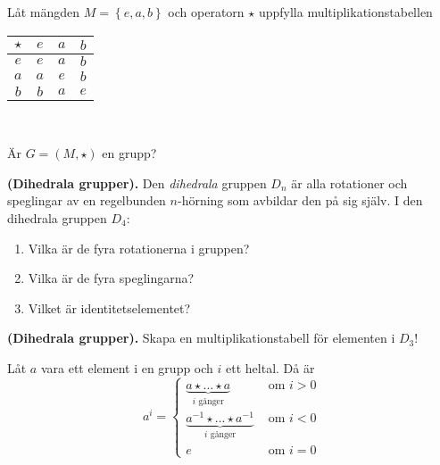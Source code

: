 \documentclass[11pt,fleqn]{book} %
\begin{document}
\begin{problem}
  Låt mängden \(M = \left\{e, a, b\right\}\) och operatorn \(\star\) uppfylla multiplikationstabellen \\
  { \center
  \begin{tabular}{c|ccc}
    \( \star \) & \(e\) & \(a\) & \(b\) \\ \midrule
    \(e\) & \(e\) & \(a\) & \(b\) \\
    \(a\) & \(a\) & \(e\) & \(b\) \\
    \(b\) & \(b\) & \(a\) & \(e\) \\
  \end{tabular} \\ }
  Är \(G = (M, \star )\) en grupp?
\end{problem}


\begin{problem} \textbf{(Dihedrala grupper).} Den \textit{dihedrala} gruppen \(D_n\) är alla rotationer och speglingar av en regelbunden \(n\)-hörning som avbildar den på sig själv. I den dihedrala gruppen \(D_4\):
  \begin{enumerate}[label=\textbf{(\alph*)}]
    \item Vilka är de fyra rotationerna i gruppen?
    \item Vilka är de fyra speglingarna?
    \item Vilket är identitetselementet?
  \end{enumerate}
\end{problem}

\begin{problem} \textbf{(Dihedrala grupper).} Skapa en multiplikationstabell för elementen i \(D_3\)! %
\end{problem}

\begin{definition}
  Låt \(a\) vara ett element i en grupp och \(i\) ett heltal. Då är
  \[
    a ^ i =
    \begin{cases}
      \underbrace{a  \star \dots  \star a}_{i \text{ gånger} } &\text{ om } i > 0 \\
      \underbrace{a ^{-1}  \star \dots  \star a ^{-1}}_{i \text{ gånger} } &\text{ om } i < 0 \\
      e &\text{ om } i = 0
    \end{cases} 
  \]
\end{definition}
\end{document}
